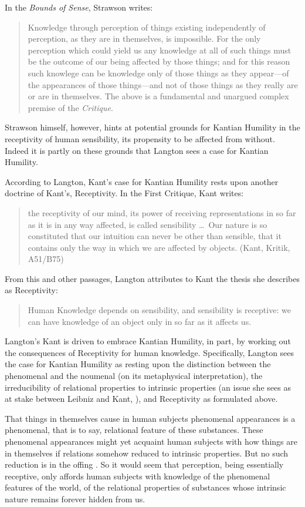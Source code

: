 In the \emph{Bounds of Sense}, Strawson writes:
\begin{quote}
	Knowledge through perception of things existing independently of perception, as they are in themselves, is impossible. For the only perception which could yield us any knowledge at all of such things must be the outcome of our being affected by those things; and for this reason such knowlege can be knowledge only of those things as they appear---of the appearances of those things---and not of those things as they really are or are in themselves. The above is a fundamental and unargued complex premise of the \emph{Critique}.
\end{quote}
Strawson himself, however, hints at potential grounds for Kantian Humility in the receptivity of human sensibility, its propensity to be affected from without. Indeed it is partly on these grounds that Langton sees a case for Kantian Humility.

According to Langton, Kant's case for Kantian Humility rests upon another doctrine of Kant's, Receptivity. In the First Critique, Kant writes:
\begin{quote}
	the receptivity of our mind, its power of receiving representations in so far as it is in any way affected, is called sensibility \ldots\ Our nature is so constituted that our intuition can never be other than sensible, that it contains only the way in which we are affected by objects. (Kant, Kritik, A51/B75)
\end{quote}
From this and other passages, Langton attributes to Kant the thesis she describes as Receptivity:
\begin{quote}
	Human Knowledge depends on sensibility, and sensibility is receptive: we can have knowledge of an object only in so far as it affects us.
\end{quote}
Langton's Kant is driven to embrace Kantian Humility, in part, by working out the consequences of Receptivity for human knowledge. Specifically, Langton sees the case for Kantian Humility as resting upon the distinction between the phenomenal and the noumenal (on its metaphysical interpretation), the irreducibility of relational properties to intrinsic properties (an issue she sees as at stake between Leibniz and Kant, \citealt[chapters 4 and 5]{Langton:1998aa}), and Receptivity as formulated above. 

That things in themselves cause in human subjects phenomenal appearances is a phenomenal, that is to say, relational feature of these substances. These phenomenal appearances might yet acquaint human subjects with how things are in themselves if relations somehow reduced to intrinsic properties. But no such reduction is in the offing \citep[chapter 5]{Langton:1998aa}. So it would seem that perception, being essentially receptive, only affords human subjects with knowledge of the phenomenal features of the world, of the relational properties of substances whose intrinsic nature remains forever hidden from us.


